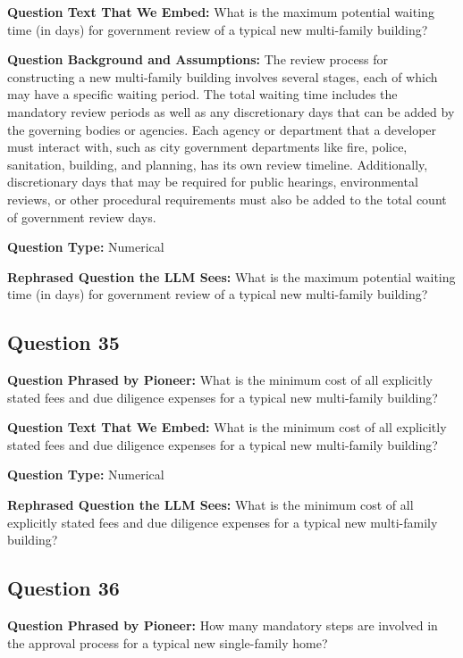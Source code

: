 \noindent\textbf{Question Text That We Embed:} What is the maximum potential waiting time (in days) for government review of a typical new multi-family building?

\noindent\textbf{Question Background and Assumptions:} The review process for constructing a new multi-family building involves several stages, each of which may have a specific waiting period. The total waiting time includes the mandatory review periods as well as any discretionary days that can be added by the governing bodies or agencies. Each agency or department that a developer must interact with, such as city government departments like fire, police, sanitation, building, and planning, has its own review timeline. Additionally, discretionary days that may be required for public hearings, environmental reviews, or other procedural requirements must also be added to the total count of government review days.

\noindent\textbf{Question Type:} Numerical

\noindent\textbf{Rephrased Question the LLM Sees:} What is the maximum potential waiting time (in days) for government review of a typical new multi-family building?

\vspace{1cm}
\subsection*{Question 35}
\noindent\textbf{Question Phrased by Pioneer:} What is the minimum cost of all explicitly stated fees and due diligence expenses for a typical new multi-family building?

\noindent\textbf{Question Text That We Embed:} What is the minimum cost of all explicitly stated fees and due diligence expenses for a typical new multi-family building?

\noindent\textbf{Question Type:} Numerical

\noindent\textbf{Rephrased Question the LLM Sees:} What is the minimum cost of all explicitly stated fees and due diligence expenses for a typical new multi-family building?

\vspace{1cm}
\subsection*{Question 36}
\noindent\textbf{Question Phrased by Pioneer:} How many mandatory steps are involved in the approval process for a typical new single-family home?

